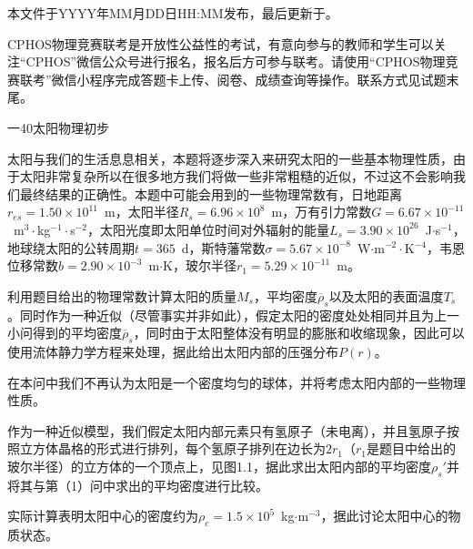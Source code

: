 \documentclass[answer]{cphos}
\begin{document}
\maketitlepage

{\kaiti\small 本文件于YYYY年MM月DD日HH:MM发布，最后更新于\compiletime 。}

{\kaiti\small CPHOS物理竞赛联考是开放性公益性的考试，有意向参与的教师和学生可以关注“CPHOS”微信公众号进行报名，报名后方可参与联考。请使用“CPHOS物理竞赛联考”微信小程序完成答题卡上传、阅卷、成绩查询等操作。联系方式见试题末尾。}

\vspace{1em}

\begin{problem}{一}{40}{太阳物理初步}

\begin{problemstatement}
太阳与我们的生活息息相关，本题将逐步深入来研究太阳的一些基本物理性质，由于太阳非常复杂所以在很多地方我们将做一些非常粗糙的近似，不过这不会影响我们最终结果的正确性。本题中可能会用到的一些物理常数有，日地距离$r_{es}=1.50\times 10^{11}$~m，太阳半径$R_s=6.96\times 10^{8}$~m，万有引力常数$G=6.67\times 10^{-11}$~m$^3\cdot$kg$^{-1}\cdot$s$^{-2}$，太阳光度即太阳单位时间对外辐射的能量$L_s=3.90\times 10^{26}$~J$\cdot$s$^{-1}$，地球绕太阳的公转周期$t=365$~d，斯特藩常数$\sigma=5.67\times 10^{-8}$~W$\cdot$m$^{-2}\cdot$K$^{-4}$，韦恩位移常数$b=2.90\times 10^{-3}$~m$\cdot$K，玻尔半径$r_1=5.29\times 10^{-11}$~m。

利用题目给出的物理常数计算太阳的质量$M_s$，平均密度$\overline{\rho}_s$以及太阳的表面温度$T_s$。同时作为一种近似（尽管事实并非如此），假定太阳的密度处处相同并且为上一小问得到的平均密度$\overline{\rho}_s$，同时由于太阳整体没有明显的膨胀和收缩现象，因此可以使用流体静力学方程来处理，据此给出太阳内部的压强分布$P(r)$。

在本问中我们不再认为太阳是一个密度均匀的球体，并将考虑太阳内部的一些物理性质。

作为一种近似模型，我们假定太阳内部元素只有氢原子（未电离），并且氢原子按照立方体晶格的形式进行排列，每个氢原子排列在边长为$2r_1$（$r_1$是题目中给出的玻尔半径）的立方体的一个顶点上，见图1.1，据此求出太阳内部的平均密度$\rho_s'$并将其与第（1）问中求出的平均密度进行比较。

实际计算表明太阳中心的密度约为$\rho_c=1.5\times 10^5$~kg$\cdot$m$^{-3}$，据此讨论太阳中心的物质状态。
\end{problemstatement}

\begin{solution}


\end{solution}
\end{problem}
\end{document}
